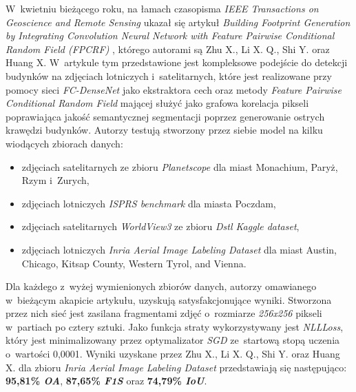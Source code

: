 W~kwietniu bieżącego roku, na łamach czasopisma \emph{IEEE Transactions on Geoscience and Remote Sensing} ukazał się artykuł \emph{Building Footprint Generation by Integrating Convolution Neural Network with Feature Pairwise Conditional Random Field (FPCRF)} \cite{zhu}, którego autorami są Zhu X., Li X. Q., Shi Y. oraz Huang X. W~artykule tym przedstawione jest kompleksowe podejście do detekcji budynków na zdjęciach lotniczych i~satelitarnych, które jest realizowane przy pomocy sieci \emph{FC-DenseNet} jako ekstraktora cech oraz metody \emph{Feature Pairwise Conditional Random Field} mającej służyć jako grafowa korelacja pikseli poprawiająca jakość semantycznej segmentacji poprzez generowanie ostrych krawędzi budynków. Autorzy testują stworzony przez siebie model na kilku wiodących zbiorach danych:  
\begin{itemize}
\item zdjęciach satelitarnych ze zbioru \emph{Planetscope} dla miast Monachium, Paryż, Rzym i~Zurych,
\item zdjęciach lotniczych \emph{ISPRS benchmark} dla miasta Poczdam,
\item zdjęciach satelitarnych \emph{WorldView3 } ze zbioru \emph{Dstl Kaggle dataset},
\item zdjęciach lotniczych \emph{Inria Aerial Image Labeling Dataset} dla miast Austin, Chicago, Kitsap County, Western Tyrol, and Vienna.
\end{itemize}

Dla każdego z~wyżej wymienionych zbiorów danych, autorzy omawianego w~bieżącym akapicie artykułu, uzyskują satysfakcjonujące wyniki. Stworzona przez nich sieć jest zasilana fragmentami zdjęć o~rozmiarze \emph{256x256} pikseli w~partiach po cztery sztuki. Jako funkcja straty wykorzystywany jest \emph{NLLLoss}, który jest minimalizowany przez optymalizator \emph{SGD} ze~startową stopą uczenia o~wartości 0,0001. Wyniki uzyskane przez Zhu X., Li X. Q., Shi Y. oraz Huang X.  dla zbioru \emph{Inria Aerial Image Labeling Dataset} przedstawiają się następująco: \textbf{95,81\% \emph{OA}}, \textbf{87,65\% \emph{F1S}} oraz \textbf{74,79\% \emph{IoU}}.

